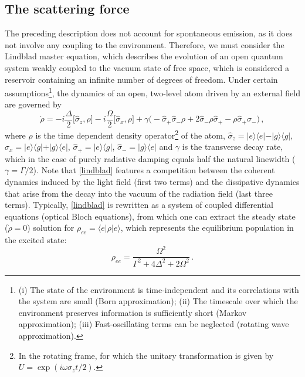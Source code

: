 \documentclass[../Thesis-IJspeert.tex]{subfiles}
\begin{document}
\subsection{The scattering force}
The preceding description does not account for spontaneous emission, as it does not involve any coupling to the environment. Therefore, we must consider the Lindblad master equation, which describes the evolution of an open quantum system weakly coupled to the vacuum state of free space, which is considered a reservoir containing an infinite number of degrees of freedom. Under certain assumptions\footnote{(i) The state of the environment is time-independent and its correlations with the system are small (Born approximation); (ii) The timescale over which the environment preserves information is sufficiently short (Markov approximation); (iii) Fast-oscillating terms can be neglected (rotating wave approximation).}, the dynamics of an open, two-level atom driven by an external field are governed by
\begin{equation}
\label{lindblad}
\dot{\rho}=-i\frac{\Delta}{2}\big[\hat{\sigma}_z,\rho\big]-i\frac{\Omega}{2}\big[\hat{\sigma}_x,\rho\big] + \gamma \big(-\hat{\sigma}_+\hat{\sigma}_-\rho+2\hat{\sigma}_-\rho\hat{\sigma}_+-\rho\hat{\sigma}_+\hat{\sigma}_-\big)\,,
\end{equation}
where $\rho$ is the time dependent density operator\footnote{In the rotating frame, for which the unitary transformation is given by $U=\exp(i\omega\sigma_z t/2)$.} of the atom,
 $\hat{\sigma}_z=\vert e \rangle \langle e \vert-\vert g \rangle \langle g \vert$, $\hat{\sigma}_x=\vert e \rangle \langle g \vert+\vert g \rangle \langle e \vert$, $\hat{\sigma}_+=\vert e \rangle \langle g \vert$, $\hat{\sigma}_-=\vert g \rangle \langle e \vert$ and $\gamma$ is the transverse decay rate, which in the case of purely radiative damping equals half the natural linewidth ($\gamma= \Gamma/2$). Note that \autoref{lindblad} features a competition between the coherent dynamics induced by the light field (first two terms) and the dissipative dynamics that arise from the decay into the vacuum of the radiation field (last three terms). Typically, \autoref{lindblad} is rewritten as a system of coupled differential equations (optical Bloch equations), from which one can extract the steady state ($\dot{\rho}=0$) solution for $\rho_{ee}=\langle e \vert \rho \vert e\rangle$, which represents the equilibrium population in the excited state:
\begin{equation}
\label{rhoee}
\rho_{ee}=\frac{\Omega^2}{\Gamma^2+4\Delta^2+2\Omega^2}\,.
\end{equation}
\end{document}
